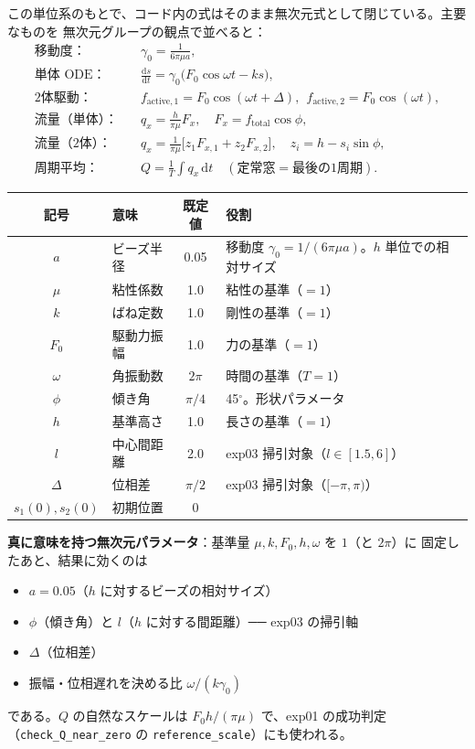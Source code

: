 \documentclass[11pt,a4paper]{article}
\newcommand{\gamz}{\gamma_{0}}
\newcommand{\dd}{\mathrm{d}}
\begin{document}
この単位系のもとで、コード内の式はそのまま無次元式として閉じている。主要なものを
無次元グループの観点で並べると：
\begin{align}
\text{移動度：}&\quad \gamz=\frac{1}{6\pi\mu a},\\
\text{単体 ODE：}&\quad \frac{\dd s}{\dd t}=\gamz\big(F_0\cos\omega t-ks\big),\\
\text{2体駆動：}&\quad f_{\mathrm{active},1}=F_0\cos(\omega t+\Delta),\ \
f_{\mathrm{active},2}=F_0\cos(\omega t),\\
\text{流量（単体）：}&\quad q_x=\frac{h}{\pi\mu}F_x,\quad F_x=f_{\mathrm{total}}\cos\phi,\\
\text{流量（2体）：}&\quad q_x=\frac{1}{\pi\mu}\big[z_1F_{x,1}+z_2F_{x,2}\big],\quad
z_i=h-s_i\sin\phi,\\
\text{周期平均：}&\quad Q=\frac{1}{T}\int q_x\,\dd t\quad(\text{定常窓}=\text{最後の1周期}).
\end{align}

\begin{table}[h]
\centering\small
\begin{tabularx}{\linewidth}{c X c X}
\toprule
記号 & 意味 & 既定値 & 役割 \\
\midrule
$a$ & ビーズ半径 & 0.05 & 移動度 $\gamz=1/(6\pi\mu a)$。$h$ 単位での相対サイズ \\
$\mu$ & 粘性係数 & 1.0 & 粘性の基準（$=1$） \\
$k$ & ばね定数 & 1.0 & 剛性の基準（$=1$） \\
$F_0$ & 駆動力振幅 & 1.0 & 力の基準（$=1$） \\
$\omega$ & 角振動数 & $2\pi$ & 時間の基準（$T=1$） \\
$\phi$ & 傾き角 & $\pi/4$ & 45$^\circ$。形状パラメータ \\
$h$ & 基準高さ & 1.0 & 長さの基準（$=1$） \\
$l$ & 中心間距離 & 2.0 & exp03 掃引対象（$l\in[1.5,6]$） \\
$\Delta$ & 位相差 & $\pi/2$ & exp03 掃引対象（$[-\pi,\pi)$） \\
$s_1(0),s_2(0)$ & 初期位置 & 0 & \\
\bottomrule
\end{tabularx}
\end{table}

\begin{keybox}
\textbf{真に意味を持つ無次元パラメータ}：基準量 $\mu,k,F_0,h,\omega$ を $1$（と $2\pi$）に
固定したあと、結果に効くのは
\begin{itemize}\setlength{\itemsep}{1pt}
\item $a=0.05$（$h$ に対するビーズの相対サイズ）
\item $\phi$（傾き角）と $l$（$h$ に対する間距離）── exp03 の掃引軸
\item $\Delta$（位相差）
\item 振幅・位相遅れを決める比 $\omega/(k\gamz)$
\end{itemize}
である。$Q$ の自然なスケールは $F_0 h/(\pi\mu)$ で、exp01 の成功判定
（\texttt{check\_Q\_near\_zero} の \texttt{reference\_scale}）にも使われる。
\end{keybox}
\end{document}
